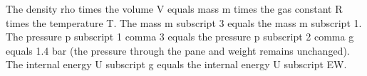 The density rho times the volume V equals mass m times the gas constant R times the temperature T.
The mass m subscript 3 equals the mass m subscript 1.
The pressure p subscript 1 comma 3 equals the pressure p subscript 2 comma g equals 1.4 bar (the pressure through the pane and weight remains unchanged).
The internal energy U subscript g equals the internal energy U subscript EW.